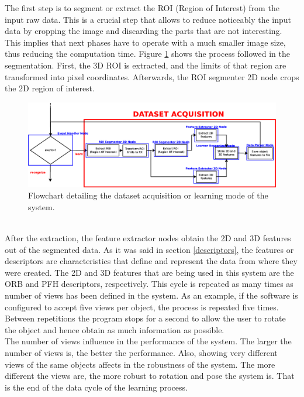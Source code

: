 The first step is to segment or extract the ROI (Region of Interest) from the input raw data. 
This is a crucial step that allows to reduce noticeably the input data by cropping the image and discarding the parts that are not interesting. 
This implies that next phases have to operate with a much smaller image size, thus reducing the computation time. 
Figure \ref{flowchart2} shows the process followed in the segmentation. 
First, the 3D ROI is extracted, and the limits of that region are transformed into pixel coordinates. 
Afterwards, the ROI segmenter 2D node crops the 2D region of interest. 
\begin{figure}[H]
	\begin{center}
\includegraphics[width=\linewidth]{img/diagrams/flowchart2.eps}
	\caption[Dataset acquisition flowchart]{Flowchart detailing the dataset acquisition or learning mode of the system.}
		\label{flowchart2}

	\end{center}
\end{figure}


\\

After the extraction, the feature extractor nodes obtain the 2D and 3D features out of the segmented data. 
As it was said in section \ref{descriptors}, the features or descriptors are characteristics that define and represent the data from where they were created. 
The 2D and 3D features that are being used in this system are the ORB and PFH descriptors, respectively. 
This cycle is repeated as many times as number of views has been defined in the system. 
As an example, if the software is configured to accept five views per object, the process is repeated five times. 
Between repetitions the program stops for a second to allow the user to rotate the object and hence obtain as much information as possible. 
\\

The number of views influence in the performance of the system. 
The larger the number of views is, the better the performance. 
Also, showing very different views of the same objects affects in the robustness of the system. 
The more different the views are, the more robust to rotation and pose the system is. 
That is the end of the data cycle of the learning process. 


